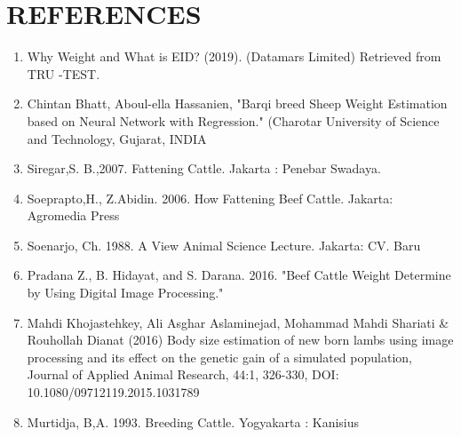 \documentclass{article}
\begin{document}
\section{REFERENCES}
\label{sec:ref}
\begin{enumerate}
    \item Why Weight and What is EID? (2019). (Datamars Limited) Retrieved from TRU -TEST.
    \item Chintan Bhatt, Aboul-ella Hassanien, "Barqi breed Sheep Weight Estimation based on Neural Network with Regression." (Charotar University of Science and Technology, Gujarat, INDIA
    \item Siregar,S. B.,2007. Fattening Cattle. Jakarta : Penebar Swadaya.
    \item Soeprapto,H., Z.Abidin. 2006. How Fattening Beef Cattle. Jakarta: Agromedia Press
    \item Soenarjo, Ch. 1988. A View Animal Science Lecture. Jakarta: CV. Baru
    \item Pradana Z., B. Hidayat, and S. Darana. 2016. "Beef Cattle Weight Determine by Using Digital Image Processing."
    \item  Mahdi Khojastehkey, Ali Asghar Aslaminejad, Mohammad Mahdi Shariati \& Rouhollah Dianat (2016) Body size estimation of new born lambs using image processing and its effect on the genetic gain of a simulated population, Journal of Applied Animal Research, 44:1, 326-330, DOI: 10.1080/09712119.2015.1031789
    \item Murtidja, B,A. 1993. Breeding Cattle. Yogyakarta : Kanisius
\end{enumerate}







\end{document}
